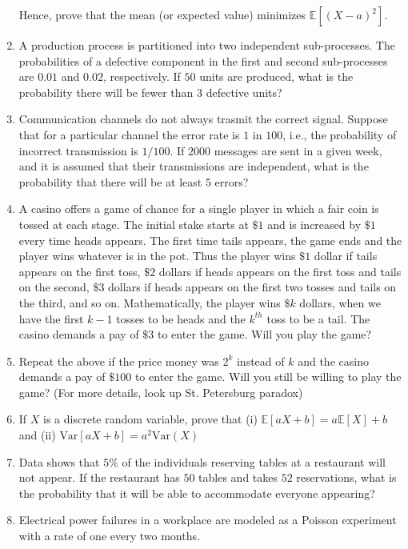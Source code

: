 \documentclass{article}
\newcommand{\bkt}[1]{\left(#1\right)}
\begin{document}
\begin{enumerate}
		Hence, prove that the mean (or expected value) minimizes $\mathbb{E}\left[\bkt{X-a}^2\right]$.
		\item
		A production process is partitioned into two independent sub-processes. The probabilities of a defective component in the first and second sub-processes are $0.01$ and $0.02$, respectively. If $50$ units are produced, what is the probability there will be fewer than $3$ defective units?
		\item
		Communication channels do not always trasmit the correct signal. Suppose that for a particular channel the error rate is $1$ in $100$, i.e., the probability of incorrect transmission is $1/100$. If $2000$ messages are sent in a given week, and it is assumed that their transmissions are independent, what is the probability that there will be at least $5$ errors?
		\item
		A casino offers a game of chance for a single player in which a fair coin is tossed at each stage. The initial stake starts at $\$ 1$ and is increased by $\$ 1$ every time heads appears. The first time tails appears, the game ends and the player wins whatever is in the pot. Thus the player wins $\$1$ dollar if tails appears on the first toss, $\$2$ dollars if heads appears on the first toss and tails on the second, $\$3$ dollars if heads appears on the first two tosses and tails on the third, and so on. Mathematically, the player wins $\$k$ dollars, when we have the first $k-1$ tosses to be heads and the $k^{th}$ toss to be a tail. The casino demands a pay of $\$3$ to enter the game. Will you play the game?
		\item
		Repeat the above if the price money was $2^k$ instead of $k$ and the casino demands a pay of $\$100$ to enter the game. Will you still be willing to play the game? (For more details, look up St. Petersburg paradox)
		\item
		If $X$ is a discrete random variable, prove that (i) $\mathbb{E}\left[aX +b\right] = a \mathbb{E}\left[X\right] + b$ and (ii) $\text{Var}\left[aX +b\right] = a^2 \text{Var}\bkt{X}$
		\item
		Data shows that $5\%$ of the individuals reserving tables at a restaurant will not appear. If the restaurant has $50$ tables and takes $52$ reservations, what is the probability that it will be able to accommodate everyone appearing?
		\item
		Electrical power failures in a workplace are modeled as a Poisson experiment with a rate of one every two months.
		\begin{enumerate}

\end{enumerate}
\end{enumerate}
\end{document}
